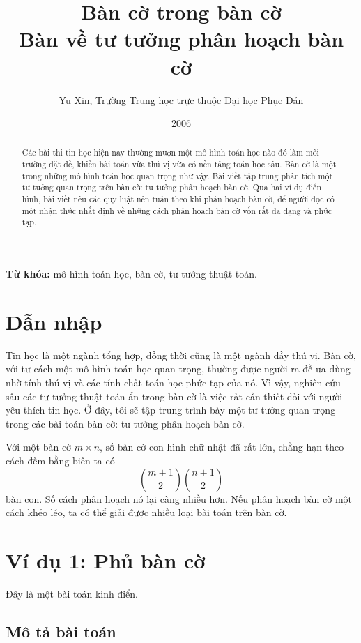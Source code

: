 \documentclass[11pt]{article}
\title{Bàn cờ trong bàn cờ\\\large Bàn về tư tưởng phân hoạch bàn cờ}
\author{Yu Xin, Trường Trung học trực thuộc Đại học Phục Đán}
\date{2006}
\begin{document}
\maketitle


\begin{abstract}
Các bài thi tin học hiện nay thường mượn một mô hình toán học nào đó làm môi
trường đặt đề, khiến bài toán vừa thú vị vừa có nền tảng toán học sâu. Bàn cờ
là một trong những mô hình toán học quan trọng như vậy. Bài viết tập trung
phân tích một tư tưởng quan trọng trên bàn cờ: tư tưởng phân hoạch bàn cờ. Qua
hai ví dụ điển hình, bài viết nêu các quy luật nên tuân theo khi phân hoạch
bàn cờ, để người đọc có một nhận thức nhất định về những cách phân hoạch bàn
cờ vốn rất đa dạng và phức tạp.
\end{abstract}

\noindent\textbf{Từ khóa:} mô hình toán học, bàn cờ, tư tưởng thuật toán.

\tableofcontents

\section{Dẫn nhập}

Tin học là một ngành tổng hợp, đồng thời cũng là một ngành đầy thú vị. Bàn cờ,
với tư cách một mô hình toán học quan trọng, thường được người ra đề ưa dùng
nhờ tính thú vị và các tính chất toán học phức tạp của nó. Vì vậy, nghiên cứu
sâu các tư tưởng thuật toán ẩn trong bàn cờ là việc rất cần thiết đối với
người yêu thích tin học. Ở đây, tôi sẽ tập trung trình bày một tư tưởng quan
trọng trong các bài toán bàn cờ: tư tưởng phân hoạch bàn cờ.

Với một bàn cờ \(m\times n\), số bàn cờ con hình chữ nhật đã rất lớn, chẳng
hạn theo cách đếm bằng biên ta có
\[
  \binom{m+1}{2}\binom{n+1}{2}
\]
bàn con. Số cách phân hoạch nó lại càng nhiều hơn. Nếu phân hoạch bàn cờ một
cách khéo léo, ta có thể giải được nhiều loại bài toán trên bàn cờ.

\section{Ví dụ 1: Phủ bàn cờ}

Đây là một bài toán kinh điển.

\subsection{Mô tả bài toán}
\end{document}
